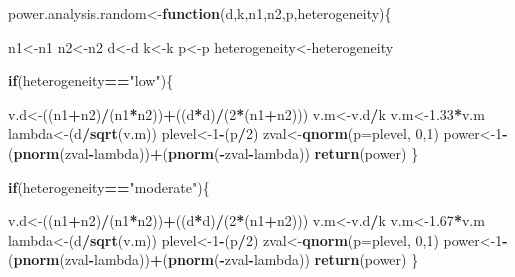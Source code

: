 \documentclass[]{book}
\newenvironment{Shaded}{\begin{snugshade}}{\end{snugshade}}
\newcommand{\ControlFlowTok}[1]{\textcolor[rgb]{0.13,0.29,0.53}{\textbf{#1}}}
\newcommand{\DataTypeTok}[1]{\textcolor[rgb]{0.13,0.29,0.53}{#1}}
\newcommand{\DecValTok}[1]{\textcolor[rgb]{0.00,0.00,0.81}{#1}}
\newcommand{\FloatTok}[1]{\textcolor[rgb]{0.00,0.00,0.81}{#1}}
\newcommand{\KeywordTok}[1]{\textcolor[rgb]{0.13,0.29,0.53}{\textbf{#1}}}
\newcommand{\NormalTok}[1]{#1}
\newcommand{\OperatorTok}[1]{\textcolor[rgb]{0.81,0.36,0.00}{\textbf{#1}}}
\newcommand{\StringTok}[1]{\textcolor[rgb]{0.31,0.60,0.02}{#1}}
\begin{document}
\begin{Shaded}
\begin{Highlighting}[]
\NormalTok{power.analysis.random<-}\ControlFlowTok{function}\NormalTok{(d,k,n1,n2,p,heterogeneity)\{}

\NormalTok{  n1<-n1}
\NormalTok{  n2<-n2}
\NormalTok{  d<-d}
\NormalTok{  k<-k}
\NormalTok{  p<-p}
\NormalTok{  heterogeneity<-heterogeneity}
  
  \ControlFlowTok{if}\NormalTok{(heterogeneity}\OperatorTok{==}\StringTok{"low"}\NormalTok{)\{}

\NormalTok{  v.d<-((n1}\OperatorTok{+}\NormalTok{n2)}\OperatorTok{/}\NormalTok{(n1}\OperatorTok{*}\NormalTok{n2))}\OperatorTok{+}\NormalTok{((d}\OperatorTok{*}\NormalTok{d)}\OperatorTok{/}\NormalTok{(}\DecValTok{2}\OperatorTok{*}\NormalTok{(n1}\OperatorTok{+}\NormalTok{n2)))}
\NormalTok{  v.m<-v.d}\OperatorTok{/}\NormalTok{k}
\NormalTok{  v.m<-}\FloatTok{1.33}\OperatorTok{*}\NormalTok{v.m}
\NormalTok{  lambda<-(d}\OperatorTok{/}\KeywordTok{sqrt}\NormalTok{(v.m))}
\NormalTok{  plevel<-}\DecValTok{1}\OperatorTok{-}\NormalTok{(p}\OperatorTok{/}\DecValTok{2}\NormalTok{)}
\NormalTok{  zval<-}\KeywordTok{qnorm}\NormalTok{(}\DataTypeTok{p=}\NormalTok{plevel, }\DecValTok{0}\NormalTok{,}\DecValTok{1}\NormalTok{)}
\NormalTok{  power<-}\DecValTok{1}\OperatorTok{-}\NormalTok{(}\KeywordTok{pnorm}\NormalTok{(zval}\OperatorTok{-}\NormalTok{lambda))}\OperatorTok{+}\NormalTok{(}\KeywordTok{pnorm}\NormalTok{(}\OperatorTok{-}\NormalTok{zval}\OperatorTok{-}\NormalTok{lambda))}
  \KeywordTok{return}\NormalTok{(power)}
\NormalTok{  \}}
  
  \ControlFlowTok{if}\NormalTok{(heterogeneity}\OperatorTok{==}\StringTok{"moderate"}\NormalTok{)\{}
    
\NormalTok{      v.d<-((n1}\OperatorTok{+}\NormalTok{n2)}\OperatorTok{/}\NormalTok{(n1}\OperatorTok{*}\NormalTok{n2))}\OperatorTok{+}\NormalTok{((d}\OperatorTok{*}\NormalTok{d)}\OperatorTok{/}\NormalTok{(}\DecValTok{2}\OperatorTok{*}\NormalTok{(n1}\OperatorTok{+}\NormalTok{n2)))}
\NormalTok{  v.m<-v.d}\OperatorTok{/}\NormalTok{k}
\NormalTok{  v.m<-}\FloatTok{1.67}\OperatorTok{*}\NormalTok{v.m}
\NormalTok{  lambda<-(d}\OperatorTok{/}\KeywordTok{sqrt}\NormalTok{(v.m))}
\NormalTok{  plevel<-}\DecValTok{1}\OperatorTok{-}\NormalTok{(p}\OperatorTok{/}\DecValTok{2}\NormalTok{)}
\NormalTok{  zval<-}\KeywordTok{qnorm}\NormalTok{(}\DataTypeTok{p=}\NormalTok{plevel, }\DecValTok{0}\NormalTok{,}\DecValTok{1}\NormalTok{)}
\NormalTok{  power<-}\DecValTok{1}\OperatorTok{-}\NormalTok{(}\KeywordTok{pnorm}\NormalTok{(zval}\OperatorTok{-}\NormalTok{lambda))}\OperatorTok{+}\NormalTok{(}\KeywordTok{pnorm}\NormalTok{(}\OperatorTok{-}\NormalTok{zval}\OperatorTok{-}\NormalTok{lambda))}
  \KeywordTok{return}\NormalTok{(power)}
\NormalTok{  \}}
    

\end{Highlighting}
\end{Shaded}
\end{document}
